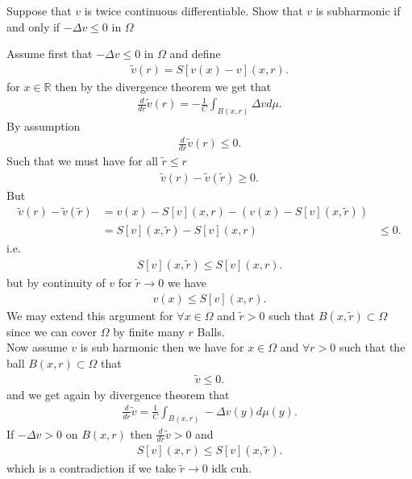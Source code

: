 \begin{question}[b]
 Suppose that $v$ is twice continuous differentiable. Show that $v$ is subharmonic if and only 
 if $- \Delta v \le 0$ in $\Omega$
\end{question}
\begin{solution}
 Assume first that $-\Delta v \le 0$ in $\Omega$ and define 
 \begin{align*}
   \tilde{v}(r) = S[v(x)-v](x,r) 
 .\end{align*}
 for $x \in  \mathbb{R}$ then by the divergence theorem we get that 
 \begin{align*}
   \frac{d}{dr}\tilde{v}(r)  =  -\frac{1}{C} \int_{B(x,r)} \Delta v d\mu
 .\end{align*}
 By assumption 
 \begin{align*}
   \frac{d}{dr} \tilde{v}(r)  \le  0
 .\end{align*}
 Such that we must have for all $\tilde{r} \le r $
 \begin{align*}
   \tilde{v}(r) - \tilde{v}(\tilde{r}) \ge 0
 .\end{align*}
 But 
 \begin{align*}
   \tilde{v}(r) - \tilde{v}(\tilde{r})  &= v(x) - S[v](x,r) - (v(x) - S[v](x,\tilde{r})) \\
                                          &= S[v](x,\tilde{r}) - S[v](x,r) 
                                          &\le 0
 .\end{align*}
 i.e. 
 \begin{align*}
   S[v](x,\tilde{r}) \le S[v](x,r)
 .\end{align*}
 but by continuity of $v$ for $\tilde{r}\to 0$  we have
 \begin{align*}
   v(x) \le S[v](x,r)
 .\end{align*}
 We may extend this argument for $\forall  x \in  \Omega $ and $\tilde{r}>0$ such that $B(x,\tilde{r}) \subset  \Omega $ since we can cover
 $\Omega $ by finite many $r$ Balls.\\[1ex]
 Now assume $v$ is sub harmonic then we have for $x \in  \Omega $ and $\forall r>0$ such that
 the ball $B(x,r) \subset  \Omega $ that
 \begin{align*}
   \tilde{v} \le  0 
 .\end{align*}
 and we get again by divergence theorem that 
 \begin{align*}
   \frac{d}{dr} \tilde{v} = \frac{1}{C} \int_{B(x,r)} - \Delta v(y) d\mu(y)
 .\end{align*}
 If $ - \Delta v > 0 $ on $B(x,r)$  then $\frac{d}{dr} \tilde{v}  > 0  $ and 
 \begin{align*}
   S[v](x,r) \le  S[v](x,\tilde{r} )
 .\end{align*}
 which is a contradiction if we take $\tilde{r} \to 0 $ idk cuh.
\end{solution}

